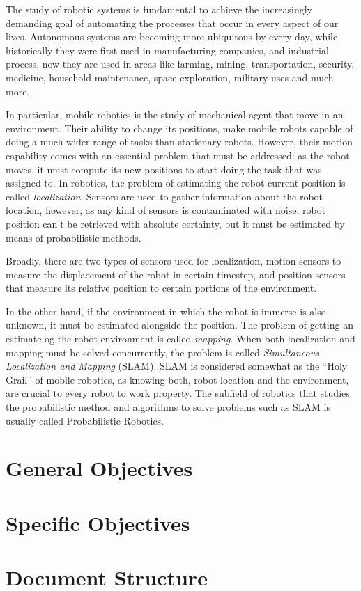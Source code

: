 The study of robotic systems is fundamental to achieve the increasingly demanding goal of automating the processes that occur in every aspect of our lives. Autonomous systems are becoming more ubiquitous by every day, while historically they were first used in manufacturing companies, and industrial process, now they are used in areas like farming, mining, transportation, security, medicine, household maintenance, space exploration, military uses and much more.

In particular, mobile robotics is the study of mechanical agent that move in an environment. Their ability to change its positions, make mobile robots capable of doing a much wider range of tasks than stationary robots. However, their motion capability comes with an essential problem that must be addressed: as the robot moves, it must compute its new positions to start doing the task that was assigned to. In robotics, the problem of estimating the robot current position is called \textit{localization}. Sensors are used to gather information about the robot location, however, as any kind of sensors is contaminated with noise, robot position can't be retrieved with absolute certainty, but it must be estimated by means of probabilistic methods.  

Broadly, there are two types of sensors used for localization, motion sensors to measure the displacement of the robot in certain timestep, and position sensors that measure its relative position to certain portions of the environment.

In the other hand, if the environment in which the robot is immerse is also unknown, it must be estimated alongside the position. The problem of getting an estimate og the robot environment is called \textit{mapping}. When both localization and mapping must be solved concurrently, the problem is called \textit{Simultaneous Localization and Mapping} (SLAM). SLAM is considered somewhat as the ``Holy Grail'' of mobile robotics, as knowing both, robot location and the environment, are crucial  to every robot to work property. The subfield of robotics that studies the probabilistic method and algorithms to solve problems such as SLAM is usually called Probabilistic Robotics.   


\section{General Objectives}



\section{Specific Objectives}

\section{Document Structure}
